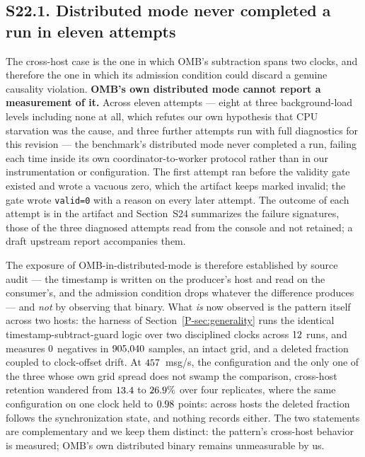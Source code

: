\documentclass[10pt,journal,onecolumn]{IEEEtran}
\newcommand{\mainGenerality}{\ref{P-sec:generality}}       %
\begin{document}
\subsection{S22.1. Distributed mode never completed a run in eleven attempts}
The cross-host case is the one in which OMB's subtraction spans two clocks, and therefore the one
in which its admission condition could discard a genuine causality violation. \textbf{OMB's own distributed
mode cannot report a measurement of it.} Across eleven attempts --- eight at three
background-load levels including none at all, which refutes our own hypothesis that CPU
starvation was the cause, and three further attempts run with full diagnostics for this revision
--- the benchmark's distributed mode never completed a run, failing each time inside its own
coordinator-to-worker protocol rather than in our instrumentation or configuration. The first
attempt ran before the validity gate existed and wrote a vacuous zero, which the artifact keeps
marked invalid; the gate wrote \texttt{valid=0} with a reason on every later attempt. The outcome
of each attempt is in the artifact and Section~S24 summarizes the failure signatures, those of the
three diagnosed attempts read from the console and not retained; a draft upstream report
accompanies them.

The exposure of OMB-in-distributed-mode is therefore established by source audit --- the
timestamp is written on the producer's host and read on the consumer's, and the admission condition drops
whatever the difference produces --- and \emph{not} by observing that binary. What \emph{is} now
observed is the pattern itself across two hosts: the harness of Section~\mainGenerality{} runs the identical timestamp-subtract-guard logic over two disciplined clocks across
$12$ runs, and measures $0$
negatives in $905{,}040$ samples, an intact grid, and a deleted fraction
coupled to clock-offset drift. At $457$~msg/s, the \harnessXHostArmClass{}
configuration and the only one of the three whose own grid spread does not swamp the
comparison, cross-host retention wandered from $13.4$ to $26.9\%$
over four replicates, where the same configuration on one clock held to
$0.98$ points: across hosts the deleted fraction follows the synchronization
state, and nothing records either. The two
statements are complementary and we keep them distinct: the pattern's cross-host behavior is
measured; OMB's own distributed binary remains unmeasurable by us.
\end{document}
